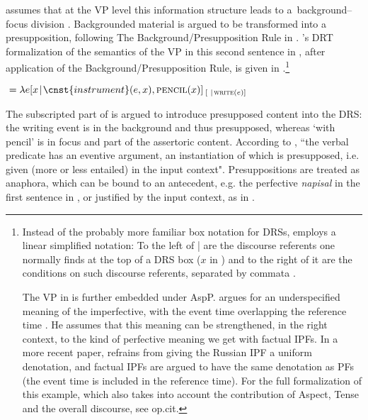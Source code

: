 \documentclass[output=paper,modfonts,newtxmath,hidelinks
]{langscibook}
\begin{document}
\sloppy \noindent \citeauthor{gronndiss} assumes that at the VP level this information structure leads to a~background--focus division \citep[in the sense of][]{krifka01}. Backgrounded material is argued to be transformed into a presupposition, following The Background/Presupposition Rule in \citet{geurtssandt97}. \citeauthor{gronndiss}'s DRT formalization of the semantics of the VP in this second sentence in , after application of the Background/Presupposition Rule, is given in  \citep[][193]{gronndiss}.\footnote{Instead of the probably more familiar box notation for DRSs, \citeauthor{gronndiss} employs a linear simplified notation: To the left of | are the discourse referents one normally finds at the top of a DRS box ($x$ in ) and to the right of it are the conditions on such discourse referents, separated by commata \citep[for further discussion see][43]{gronndiss}. 

The VP in  is further embedded under AspP. \citet{gronndiss} argues for an underspecified meaning of the imperfective, with the event time overlapping the reference time  \citep[building on][]{klein95}. He assumes that this meaning can be strengthened, in the right context, to the kind of perfective meaning we get with factual IPFs. In a more recent paper, \citet{gronn15} refrains from giving the Russian IPF a uniform denotation, and factual IPFs are argued to have the same denotation as PFs (the event time is included in the reference time). For the full formalization of this example, which also takes into account the contribution of Aspect, Tense and the overall discourse, see op.cit.} 

\ea\label{gronnanalysis}
${}=\lambda e[x\hspace{0.1em} |\hspace{0.1em} \cnst{instrument}(e, x), \textsc{pencil}(x)]_{\hspace{2pt}[ \hspace{0.3em} |\hspace{0.1em}\textsc{write}(e)]}$
\z
	
\noindent The subscripted part of  is argued to introduce presupposed content into the DRS: the writing event is in the background and thus presupposed, whereas `with pencil' is in focus and part of the assertoric content. According to \citet[][192]{gronndiss}, ``the verbal predicate has an eventive argument, an instantiation of which is presupposed, i.e. given (more or less entailed) in the input context". Presuppositions are treated as anaphora, which can be bound to an antecedent, e.g. the perfective \textit{napisal} in the first sentence in , or justified by the input context, as in .
\end{document}
